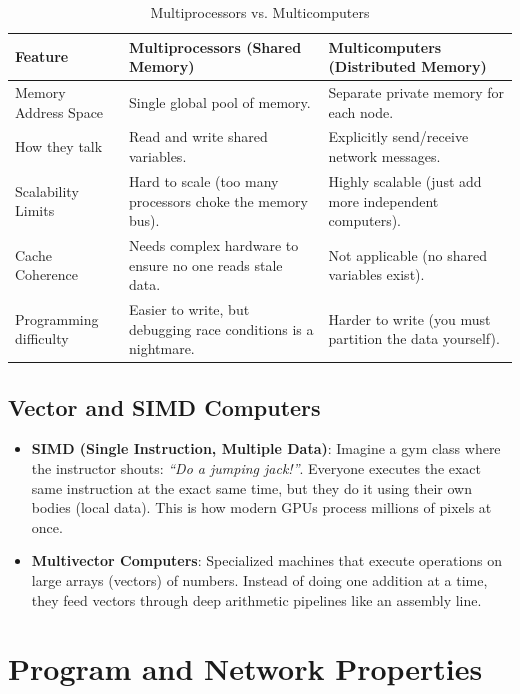 \documentclass[11pt,a4paper]{article}
\begin{document}
\begin{table}[h]
\centering
\caption{Multiprocessors vs. Multicomputers}
\begin{tabularx}{\textwidth}{@{}lXX@{}}
\toprule
\textbf{Feature} & \textbf{Multiprocessors (Shared Memory)} & \textbf{Multicomputers (Distributed Memory)} \\ \midrule
Memory Address Space & Single global pool of memory. & Separate private memory for each node. \\
How they talk & Read and write shared variables. & Explicitly send/receive network messages. \\
Scalability Limits & Hard to scale (too many processors choke the memory bus). & Highly scalable (just add more independent computers). \\
Cache Coherence & Needs complex hardware to ensure no one reads stale data. & Not applicable (no shared variables exist). \\
Programming difficulty & Easier to write, but debugging race conditions is a nightmare. & Harder to write (you must partition the data yourself). \\ \bottomrule
\end{tabularx}
\end{table}

\subsection{Vector and SIMD Computers}
\begin{itemize}
    \item \textbf{SIMD (Single Instruction, Multiple Data)}: Imagine a gym class where the instructor shouts: \textit{``Do a jumping jack!''}. Everyone executes the exact same instruction at the exact same time, but they do it using their own bodies (local data). This is how modern GPUs process millions of pixels at once.
    \item \textbf{Multivector Computers}: Specialized machines that execute operations on large arrays (vectors) of numbers. Instead of doing one addition at a time, they feed vectors through deep arithmetic pipelines like an assembly line.
\end{itemize}

\section{Program and Network Properties}
\end{document}
